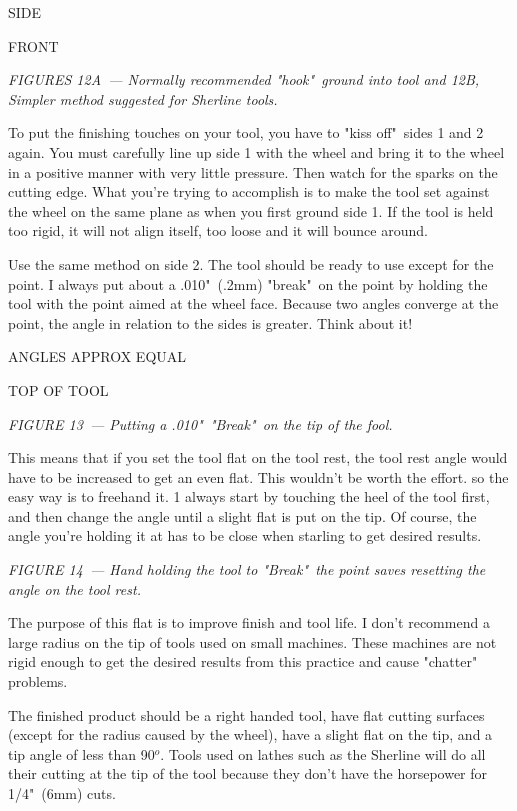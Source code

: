 \bigskip
SIDE

FRONT
\bigskip

\textit{FIGURES 12A\ --- Normally recommended "hook"\ ground into tool and 12B,
Simpler method suggested for Sherline tools.}
\bigskip

To put the finishing touches on your tool, you have to "kiss off"\ sides 1 and 2
again. You must carefully line up side 1 with the wheel and bring it to the
wheel in a positive manner with very little pressure. Then watch for the sparks
on the cutting edge. What you're trying to accomplish is to make the tool set
against the wheel on the same plane as when you first ground side 1. If the tool
is held too rigid, it will not align itself, too loose and it will bounce
around.


Use the same method on side 2. The tool should be ready to use except for the
point. I always put about a .010"\ (.2mm) "break"\ on the point by holding the
tool with the point aimed at the wheel face. Because two angles converge at the
point, the angle in relation to the sides is greater. Think about it!

\bigskip
ANGLES APPROX EQUAL

TOP OF TOOL
\bigskip

\textit{FIGURE 13\ --- Putting a .010"\ "Break"\ on the tip of the fool.}
\bigskip

This means that if you set the tool flat on the tool rest, the tool rest angle
would have to be increased to get an even flat. This wouldn't be worth the
effort. so the easy way is to freehand it. 1 always start by touching the heel
of the tool first, and then change the angle until a slight flat is put on the
tip. Of course, the angle you're holding it at has to be close when starling to
get desired results.

\bigskip
\textit{FIGURE 14\ --- Hand holding the tool to "Break"\ the point saves
resetting the angle on the tool rest.}
\bigskip

The purpose of this flat is to improve finish and tool life. I don't recommend a
large radius on the tip of tools used on small machines. These machines are not
rigid enough to get the desired results from this practice and cause "chatter"
problems.


The finished product should be a right handed tool, have flat cutting surfaces
(except for the radius caused by the wheel), have a slight flat on the tip, and
a tip angle of less than 90$^o$. Tools used on lathes such as the Sherline will do
all their cutting at the tip of the tool because they don't have the horsepower
for 1/4"\ (6mm) cuts.

